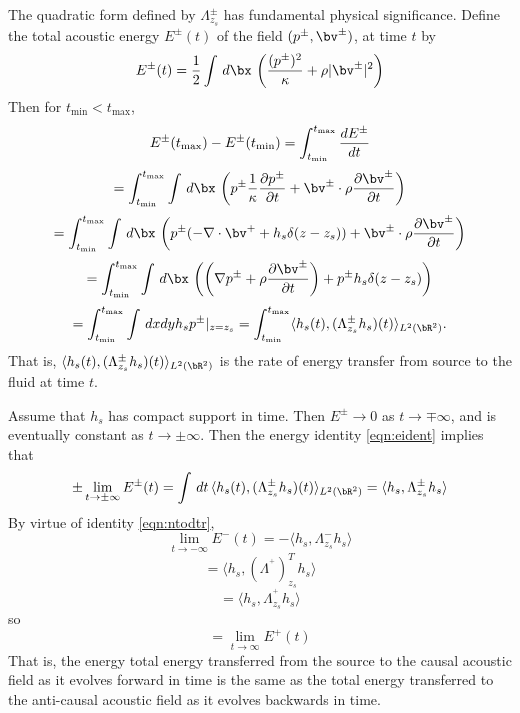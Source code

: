 The quadratic form defined by $\Lambda^{\pm}_{z_s}$ has fundamental physical
significance. Define the total acoustic energy $E^{\pm}(t)$ of the field $(p^{\pm},\bv^{\pm})$, at time $t$ by
\begin{equation}
  \label{eqn:defae}
  E^{\pm}(t) = \frac{1}{2} \int \,d\bx \, \left(\frac{(p^{\pm})^2}{\kappa} + \rho |\bv^{\pm}|^2\right)
\end{equation}
Then for $t_{\min}<t_{\max}$,
\[
  E^{\pm}(t_{\rm max})-E^{\pm}(t_{\rm min}) = \int_{t_{\rm min}}^{t_{\rm max}} \frac{dE^{\pm}}{dt}
\]
\[
  = \int_{t_{\rm min}}^{t_{\rm max}} \int\,d\bx\, \left(p^{\pm} \frac{1}{\kappa}\frac{\partial p^{\pm}}{\partial t} + \bv^{\pm} \cdot \rho \frac{\partial \bv^{\pm}}{\partial t}\right)
\]
\[
  =\int_{t_{\rm min}}^{t_{\rm max}} \int\,d\bx\,\left(p^{\pm}(-\nabla \cdot \bv^{+} + h_s\delta(z-z_s)) + \bv^{\pm} \cdot \rho \frac{\partial \bv^{\pm}}{\partial t}\right)
\]
\[
=  \int_{t_{\rm min}}^{t_{\rm max}}\int\,d\bx\, \left(\left(\nabla p^{\pm}+\rho \frac{\partial \bv^{\pm}}{\partial t}\right) + p^{\pm}h_s\delta(z-z_s)\right)
\]
\begin{equation}
  \label{eqn:eident}
  =  \int_{t_{\rm min}}^{t_{\rm max}}\int\,dxdy h_s p^{\pm}|_{z=z_s} = \int_{t_{\min}}^{t_{\max}}\langle h_s(t), (\Lambda^{\pm}_{z_s} h_s)(t) \rangle_{L^2(\bR^2)}.
\end{equation}
That is, $\langle h_s(t), (\Lambda^{\pm}_{z_s} h_s)(t)
\rangle_{L^2(\bR^2)}$ is the rate of energy transfer from source to
the fluid at time $t$.

Assume that $h_s$ has compact support in time. Then $E^{\pm}
\rightarrow 0$ as $t \rightarrow \mp \infty$, and is eventually
constant as $t \rightarrow \pm \infty$. Then the energy identity
\ref{eqn:eident} implies that
\begin{equation}
  \label{eqn:etot}
  \pm \lim_{t \rightarrow \pm \infty} E^{\pm}(t) = \int \,dt\, \langle
  h_s(t), (\Lambda^{\pm}_{z_s} h_s)(t)\rangle_{L^2(\bR^2)} = \langle
  h_s,\Lambda^{\pm}_{z_s} h_s\rangle
\end{equation}
By virtue of identity \ref{eqn:ntodtr},
\[
  \lim_{t \rightarrow -\infty}E^{-}(t) =-\langle
  h_s,\Lambda^{-}_{z_s} h_s\rangle
\]
\[
  =  \langle  h_s,(\Lambda^{^+})^T_{z_s} h_s\rangle
\]
\[
  =  \langle  h_s,\Lambda^{^+}_{z_s} h_s\rangle
\]
so
\begin{equation}
  \label{eqn:surfenergy}
  = \lim_{t \rightarrow \infty}E^{+}(t)
\end{equation}
That is, the energy total energy transferred from the source to the
causal acoustic field as it evolves forward in time is the same as the
total energy transferred to the anti-causal acoustic field as it
evolves backwards in time.

